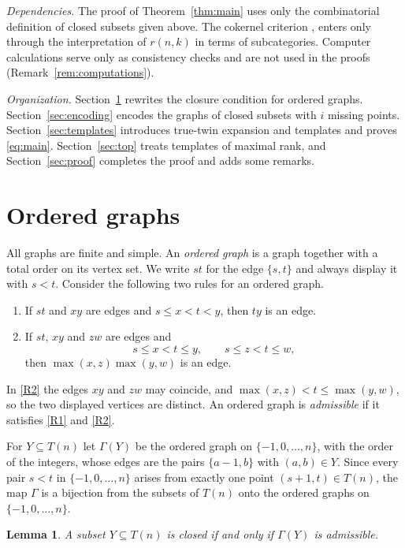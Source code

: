 \documentclass[11pt]{amsart}
\newtheorem{lemma}[theorem]{Lemma}
\theoremstyle{definition}
\theoremstyle{remark}
\numberwithin{equation}{section}
\begin{document}
\emph{Dependencies.} The proof of Theorem~\ref{thm:main} uses only the combinatorial definition of closed subsets given above. The cokernel criterion \cite[Lemma~7]{KS}, \cite[Lemma~1]{MX} enters only through the interpretation of $r(n,k)$ in terms of subcategories. Computer calculations serve only as consistency checks and are not used in the proofs (Remark~\ref{rem:computations}).

\emph{Organization.} Section~\ref{sec:graphs} rewrites the closure condition for ordered graphs. Section~\ref{sec:encoding} encodes the graphs of closed subsets with $i$ missing points. Section~\ref{sec:templates} introduces true-twin expansion and templates and proves \eqref{eq:main}. Section~\ref{sec:top} treats templates of maximal rank, and Section~\ref{sec:proof} completes the proof and adds some remarks.

\section{Ordered graphs}\label{sec:graphs}

All graphs are finite and simple. An \emph{ordered graph} is a graph together with a total order on its vertex set. We write $st$ for the edge $\{s,t\}$ and always display it with $s<t$. Consider the following two rules for an ordered graph.
\begin{enumerate}[label=\textup{(R\arabic*)},leftmargin=3.2em]
\item\label{R1} If $st$ and $xy$ are edges and $s\le x<t<y$, then $ty$ is an edge.
\item\label{R2} If $st$, $xy$ and $zw$ are edges and
\[
s\le x<t\le y,\qquad s\le z<t\le w,
\]
then $\max(x,z)\max(y,w)$ is an edge.
\end{enumerate}
In \ref{R2} the edges $xy$ and $zw$ may coincide, and $\max(x,z)<t\le\max(y,w)$, so the two displayed vertices are distinct. An ordered graph is \emph{admissible} if it satisfies \ref{R1} and \ref{R2}.

For $Y\subseteq T(n)$ let $\Gamma(Y)$ be the ordered graph on $\{-1,0,\dots,n\}$, with the order of the integers, whose edges are the pairs $\{a-1,b\}$ with $(a,b)\in Y$. Since every pair $s<t$ in $\{-1,0,\dots,n\}$ arises from exactly one point $(s+1,t)\in T(n)$, the map $\Gamma$ is a bijection from the subsets of $T(n)$ onto the ordered graphs on $\{-1,0,\dots,n\}$.

\begin{lemma}\label{lem:graph-rules}
A subset $Y\subseteq T(n)$ is closed if and only if $\Gamma(Y)$ is admissible.
\end{lemma}
\end{document}
